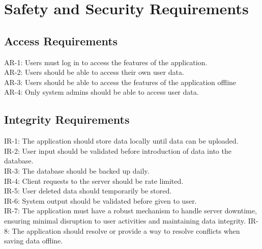 \documentclass{article}
\begin{document}






\section{Safety and Security Requirements}

\subsection{Access Requirements}
AR-1: Users must log in to access the features of the application. \\
AR-2: Users should be able to access their own user data. \\ 
AR-3: Users should be able to access the features of the application offline\\
AR-4: Only system admins should be able to access user data. \\



\subsection{Integrity Requirements}
IR-1: The application should store data locally until data can be uploaded. \\
IR-2: User input should be validated before introduction of data into the database. \\
IR-3: The database should be backed up daily. \\
IR-4: Client requests to the server should be rate limited. \\
IR-5: User deleted data should temporarily be stored. \\
IR-6: System output should be validated before given to user. \\
IR-7: The application must have a robust mechanism to handle server downtime, ensuring minimal disruption to user activities and maintaining data integrity.
IR-8: The application should resolve or provide a way to resolve conflicts when saving data offline.
\end{document}
